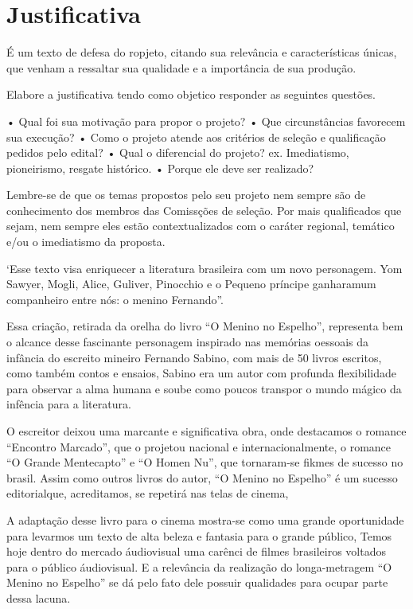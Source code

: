 \section{Justificativa}
É um texto de defesa do ropjeto, citando sua relevância e características únicas, que venham a ressaltar sua qualidade e a importância de sua produção.

Elabore a justificativa tendo como objetico responder as seguintes questões.

    • Qual foi sua motivação para propor o projeto?
    • Que circunstâncias favorecem sua execução?
    • Como o projeto atende aos critérios de seleção e qualificação pedidos pelo edital?
    • Qual o diferencial do projeto? ex. Imediatismo, pioneirismo, resgate histórico.
    • Porque ele deve ser realizado?

Lembre-se de que os temas propostos pelo seu projeto nem sempre são de conhecimento dos membros das Comissções de seleção. Por mais qualificados que sejam, nem sempre eles estão contextualizados com o caráter regional, temático e/ou o imediatismo da proposta.

‘Esse texto visa enriquecer a literatura brasileira com um novo personagem. Yom Sawyer, Mogli, Alice, Guliver, Pinocchio e o Pequeno príncipe ganharamum companheiro entre nós: o menino Fernando”.

Essa criação, retirada da orelha do livro “O Menino no Espelho”, representa bem o alcance desse fascinante personagem inspirado nas memórias oessoais da infância do escreito mineiro Fernando Sabino, com mais de 50 livros escritos, como também contos e ensaios, Sabino era um autor com profunda flexibilidade para observar a alma humana e soube como poucos transpor o mundo mágico da infência para a literatura.

O escreitor deixou uma marcante e significativa obra, onde destacamos o romance “Encontro Marcado”, que o projetou nacional e internacionalmente, o romance “O Grande Mentecapto” e “O Homen Nu”, que tornaram-se fikmes de sucesso no brasil. Assim como outros livros do autor, “O Menino no Espelho” é um sucesso editorialque, acreditamos, se repetirá nas telas de cinema,

A adaptação desse livro para o cinema mostra-se como uma grande oportunidade para levarmos um texto de alta beleza e fantasia para o grande público, Temos hoje dentro do mercado áudiovisual uma carênci de filmes brasileiros voltados para o público áudiovisual. E a relevância da realização do longa-metragem “O Menino no Espelho” se dá pelo fato dele possuir qualidades para ocupar parte dessa lacuna. 

